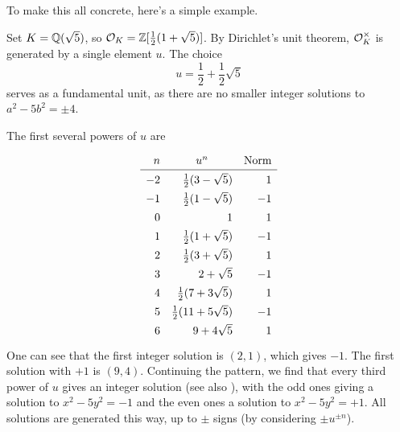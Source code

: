 To make this all concrete, here's a simple example.
\begin{example}[$x^2-5y^2 = \pm 1$]
	Set $K = \mathbb Q(\sqrt 5)$, so $\mathcal O_K = \mathbb Z[\frac{1}{2}(1+\sqrt 5)]$.
	By Dirichlet's unit theorem, $\mathcal O_K^\times$ is generated by a single element $u$.
	The choice
	\[ u = \frac 12 + \frac 12 \sqrt 5 \]
	serves as a fundamental unit,
	as there are no smaller integer solutions to $a^2-5b^2=\pm 4$.

	The first several powers of $u$ are
	\[
	\begin{array}{rrr}
		\renewcommand{\arraystretch}{1.4}
		n & \multicolumn{1}{c}{u^n} & \text{Norm} \\ \hline
		-2 & \half(3-\sqrt5) & 1 \\
		-1 & \half (1-\sqrt5) & -1 \\
		0 & 1 & 1 \\
		1 & \half(1+\sqrt5) & -1 \\
		2 & \half(3+\sqrt5) & 1 \\
		3 & 2 + \sqrt 5 & -1 \\
		4 & \half(7+3\sqrt5) & 1 \\
		5 & \half(11+5\sqrt5) & -1 \\
		6 & 9 + 4\sqrt 5 & 1
	\end{array}
	\]
	One can see that the first integer solution is $(2,1)$, which gives $-1$.
	The first solution with $+1$ is $(9,4)$.
	Continuing the pattern, we find that every third power of $u$ gives an integer solution
	(see also ),
	with the odd ones giving a solution to $x^2-5y^2=-1$ and
	the even ones a solution to $x^2-5y^2=+1$.
	All solutions are generated this way, up to $\pm$ signs
	(by considering $\pm u^{\pm n}$).
\end{example}

